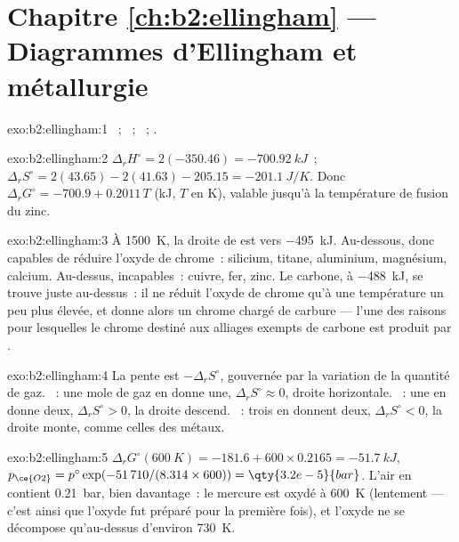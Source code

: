 \section*{Chapitre \ref{ch:b2:ellingham} --- Diagrammes d'Ellingham et métallurgie}

\begin{solution}{exo:b2:ellingham:1}
~; ~; ~;
.
\end{solution}

\begin{solution}{exo:b2:ellingham:2}
$\Delta_r H^\circ = 2(-350.46) = \qty{-700.92}{kJ}$~; $\Delta_r S^\circ = 2(43.65)
- 2(41.63) - 205.15 = \qty{-201.1}{J/K}$. Donc $\Delta_r G^\circ = -700.9 +
0.2011\,T$ (\unit{kJ}, $T$ en \unit{K}), valable jusqu'à la température de fusion du zinc.
\end{solution}

\begin{solution}{exo:b2:ellingham:3}
À \qty{1500}{K}, la droite de  est vers \qty{-495}{kJ}. Au-dessous, donc
capables de réduire l'oxyde de chrome~: silicium, titane, aluminium, magnésium,
calcium. Au-dessus, incapables~: cuivre, fer, zinc. Le carbone, à \qty{-488}{kJ}, se trouve
juste au-dessus~: il ne réduit l'oxyde de chrome qu'à une température un peu plus élevée,
et donne alors un chrome chargé de carbure --- l'une des raisons pour lesquelles le chrome destiné
aux alliages exempts de carbone est produit par .
\end{solution}

\begin{solution}{exo:b2:ellingham:4}
La pente est $-\Delta_r S^\circ$, gouvernée par la variation de la quantité de gaz.
~: une mole de gaz en donne une, $\Delta_r S^\circ \approx 0$,
droite horizontale. ~: une en donne deux, $\Delta_r S^\circ > 0$, la
droite descend. ~: trois en donnent deux, $\Delta_r S^\circ < 0$, la
droite monte, comme celles des métaux.
\end{solution}

\begin{solution}{exo:b2:ellingham:5}
$\Delta_r G^\circ(\qty{600}{K}) = -181.6 + 600 \times 0.2165 = \qty{-51.7}{kJ}$,
$p_{\ce{O2}} = p^\circ\exp(-51\,710/(8.314 \times 600)) = \qty{3.2e-5}{bar}$. L'air
en contient \qty{0.21}{bar}, bien davantage~: le mercure est oxydé à \qty{600}{K} (lentement
--- c'est ainsi que l'oxyde fut préparé pour la première fois), et l'oxyde ne se décompose qu'au-dessus
d'environ \qty{730}{K}.
\end{solution}

